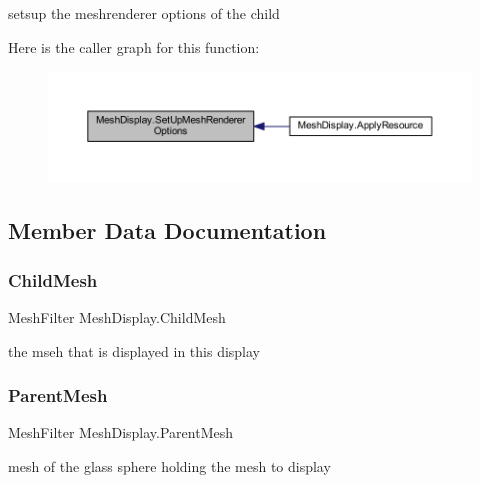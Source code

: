 setsup the meshrenderer options of the child 

Here is the caller graph for this function\+:
\nopagebreak
\begin{figure}[H]
\begin{center}
\leavevmode
\includegraphics[width=350pt]{class_mesh_display_ab87e001316410059093fac5d92326ef2_icgraph}
\end{center}
\end{figure}


\subsection{Member Data Documentation}
\mbox{\label{class_mesh_display_aef69e30c103e4ccea952b87876384d6d}} 
\subsubsection{\texorpdfstring{Child\+Mesh}{ChildMesh}}
{\footnotesize\ttfamily Mesh\+Filter Mesh\+Display.\+Child\+Mesh}



the mseh that is displayed in this display 

\mbox{\label{class_mesh_display_a112cd7fd6e19ed52906cbb4240dc6735}} 
\subsubsection{\texorpdfstring{Parent\+Mesh}{ParentMesh}}
{\footnotesize\ttfamily Mesh\+Filter Mesh\+Display.\+Parent\+Mesh}



mesh of the glass sphere holding the mesh to display 

\mbox{\label{class_mesh_display_a6b33d912f5f2abd389f3feb3af1ce621}} 
